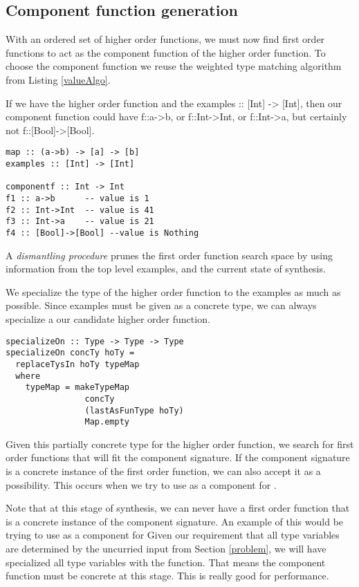 \subsection{Component function generation}\label{makeFxns}

With an ordered set of higher order functions, we must now find first order functions to act as the component function of the higher order function.
To choose the component function we reuse the weighted type matching algorithm from Listing \ref{valueAlgo}.


If we have the higher order function  and the examples :: [Int] -> [Int], then our component function  could have f::a->b, or f::Int->Int, or f::Int->a, but certainly not f::[Bool]->[Bool].

\begin{lstlisting}
map :: (a->b) -> [a] -> [b]
examples :: [Int] -> [Int]

componentf :: Int -> Int
f1 :: a->b      -- value is 1
f2 :: Int->Int  -- value is 41
f3 :: Int->a    -- value is 21
f4 :: [Bool]->[Bool] --value is Nothing
\end{lstlisting}


A \textit{dismantling procedure} prunes the first order function search space by using information from the top level examples, and the current state of synthesis.

We specialize the type of the higher order function to the examples as much as possible. Since examples must be given as a concrete type, we can always specialize a our candidate higher order function. 

\begin{lstlisting}
specializeOn :: Type -> Type -> Type
specializeOn concTy hoTy =
  replaceTysIn hoTy typeMap
  where
    typeMap = makeTypeMap 
                concTy 
                (lastAsFunType hoTy)
                Map.empty
\end{lstlisting}

Given this partially concrete type for the higher order function, we search for first order functions that will fit the component signature.
If the component signature is a concrete instance of the first order function, we can also accept it as a possibility.
This occurs when we try to use  as a component for .

Note that at this stage of synthesis, we can never have a first order function that is a concrete instance of the component signature. 
An example of this would be trying to use  as a component for 
Given our requirement that all type variables are determined by the uncurried input from Section \ref{problem}, we will have specialized all type variables with the  function.
That means the component function must be concrete at this stage.
This is really good for performance.

